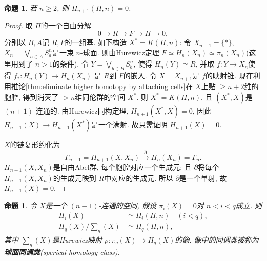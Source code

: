 \documentclass{ctexart}
\theoremstyle{plain}
\newtheorem{proposition}[theorem]{命题}
\theoremstyle{definition}
\renewcommand{\emph}{\textbf}
\begin{document}
        \begin{proposition}
            若 $n\ge 2$, 则 $H_{n+1}(\Pi,n)=0$.
        \end{proposition}

        \begin{proof}
            取 $\Pi$的一个自由分解
            \begin{equation*}
              0\to R\to F\to \Pi\to 0,
            \end{equation*}
            分别以 $B, A$记 $R,F$的一组基. 如下构造 $X^{*}=K(\Pi,n)$: 令 $X_{n-1}=\{*\}$, $X_n = \bigvee_{a \in A} S_a^n$是一束 $n$-球面. 则由Hurewicz定理 $F\simeq H_{n}(X_{n})\simeq \pi_{n}(X_{n})$(这里用到了 $n>1$的条件). 令 $Y=\bigvee_{b \in B}S^{n}_{b}$, 使得 $H_{n}(Y)\simeq R$, 并取 $f:Y\to X_{n}$使得 $f_{*}:H_{n}(Y)\to H_{n}(X_{n})$ 是 $R$到 $F$的嵌入. 令 $X=X_{n+1}$是 $f$的映射锥. 现在利用推论\ref{thm:eliminate higher homotopy by attaching cells}在 $X$上贴 $\ge n+2$维的胞腔, 得到消灭了 $>n$维同伦群的空间 $X^{*}$. 则 $X^{*}=K(\Pi,n)$, 且 $(X^{*},X)$是 $(n+1)$-连通的. 由Hurewicz同构定理, $H_{n+1}(X^{*},X)=0$, 因此 $H_{n+1}(X)\to H_{n+1}(X^{*})$是一个满射. 故只需证明 $H_{n+1}(X)=0$.

            $X$的链复形约化为
            \begin{equation*}
              \Gamma_{n+1}=H_{n+1}(X,X_{n})\stackrel{\partial}{\rightarrow}H_{n}(X_{n})=\Gamma_{n}.
            \end{equation*}
            $H_{n+1}(X,X_{n})$是自由Abel群, 每个胞腔对应一个生成元; 且 $\partial$将每个 $H_{n+1}(X,X_{n})$的生成元映到 $R$中对应的生成元. 所以 $\partial$是一个单射, 故 $H_{n+1}(X)=0$. 
        \end{proof}

        \begin{proposition}
            令 $X$是一个 $(n-1)$-连通的空间, 假设 $\pi_{i}(X)=0$对 $n<i<q$成立. 则 
            \begin{equation*}
              \begin{aligned}
              H_{i}(X) &\simeq H_{i}(\Pi,n)\quad (i<q), \\
              H_{q}(X)/\sum_{q}(X) &\simeq H_{q}(\Pi,n),
              \end{aligned}
            \end{equation*}
            其中 $\sum_{q}(X)$是Hurewicz映射 $\rho:\pi_{q}(X)\to H_{q}(X)$的像. 像中的同调类被称为\emph{球面同调类}(sperical homology class).
        \end{proposition}
\end{document}
